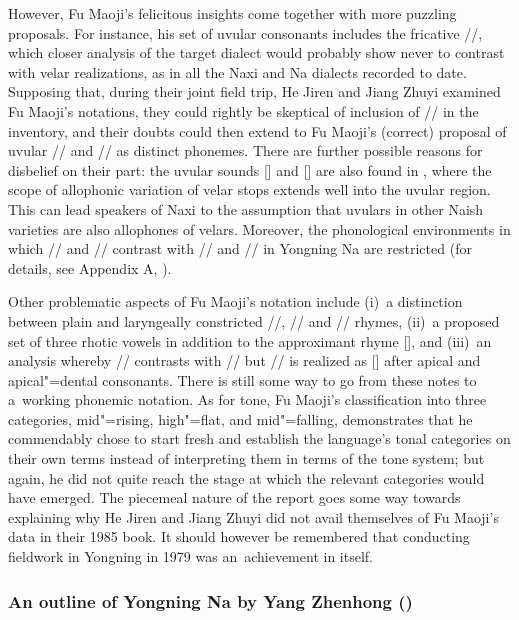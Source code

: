 However, Fu Maoji's felicitous insights come together with more puzzling proposals. For instance, his set of uvular consonants includes the fricative //, which closer analysis of the target dialect would probably show never to contrast with velar realizations, as in all the Naxi and Na dialects recorded to date. Supposing that, during their joint field trip, He Jiren and Jiang Zhuyi examined Fu Maoji's notations, they could rightly be skeptical of inclusion of // in the inventory, and their doubts could then extend to Fu Maoji's (correct) proposal of uvular // and // as distinct phonemes. There are further possible reasons for disbelief on their part: the uvular sounds [] and [] are also found in , where the scope of allophonic {variation} of velar stops extends well into the uvular region. This can lead speakers of {Naxi} to the assumption that uvulars in other {Naish} varieties are also allophones of velars. Moreover, the phonological environments in which // and // contrast with // and // in Yongning Na are restricted (for details, see Appendix A, ).

 Other problematic aspects of Fu Maoji's notation include (i)~a distinction between plain and laryngeally constricted //, // and // rhymes, (ii)~a proposed set of three rhotic vowels in addition to the approximant rhyme [], and (iii)~an analysis whereby // contrasts with // but // is realized as [] after apical and apical"=dental consonants. There is still some way to go from these notes to a~working phonemic notation. As for tone, Fu Maoji's classification into three categories, mid"=rising, high"=flat, and mid"=falling, demonstrates that he commendably chose to start fresh and establish the language's tonal categories on their own terms instead of interpreting them in terms of the  tone system; but again, he did not quite reach the stage at which the relevant categories would have emerged. The piecemeal nature of the report goes some way towards explaining why He Jiren and Jiang Zhuyi did not avail themselves of Fu Maoji's data in their 1985 book. It should however be remembered that conducting fieldwork in Yongning in 1979 was an~achievement in itself. 


\subsubsection{An outline of Yongning Na by Yang Zhenhong (\citeyear{yang2009})}
\label{sec:yang2009}

